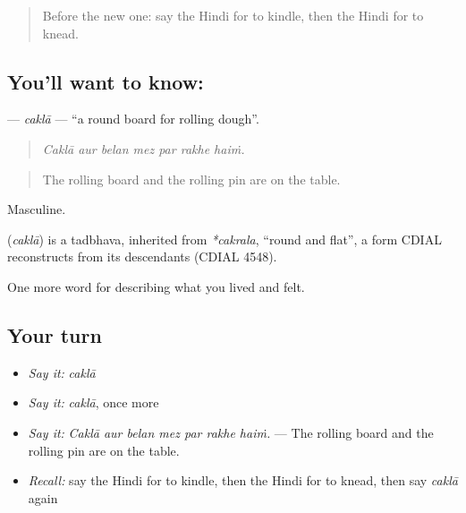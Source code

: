 \label{lesson:HI-C520-cakla}



\begin{quote}
Before the new one: say the Hindi for to kindle, then the Hindi for to knead.
\end{quote}

\subsection*{You'll want to know: }
\textbf{} — \emph{caklā} — \textquotedblleft{}a round board for rolling dough\textquotedblright{}.

\begin{quote}
      
\end{quote}

\begin{quote}
\emph{Caklā aur belan mez par rakhe haiṁ.}
\end{quote}

\begin{quote}
The rolling board and the rolling pin are on the table.
\end{quote}

Masculine.

\begin{cousinweb}
\textbf{} (\emph{caklā}) is a tadbhava, inherited from \emph{*cakrala}, \textquotedblleft{}round and flat\textquotedblright{}, a form CDIAL reconstructs from its descendants (CDIAL 4548).
\end{cousinweb}

\begin{grammarlens}[title={What you've built}]
One more word for describing what you lived and felt.
\end{grammarlens}

\subsection*{Your turn}
\begin{itemize}
\raggedright
  \item \emph{Say it:} \emph{caklā}
  \item \emph{Say it:} \emph{caklā}, once more
  \item \emph{Say it:} \emph{Caklā aur belan mez par rakhe haiṁ.} — The rolling board and the rolling pin are on the table.
  \item \emph{Recall:} say the Hindi for to kindle, then the Hindi for to knead, then say \emph{caklā} again
\end{itemize}


